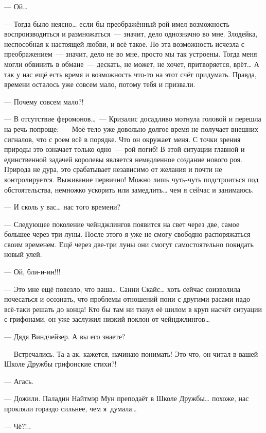 \documentclass[fontsize=11pt,a5paper,titlepage=firstcover]{scrbook}
\begin{document}
--- Ой{\ldots}

--- Тогда было неясно{\ldots} если бы преображённый рой имел возможность воспроизводиться и размножаться~--- значит, дело однозначно во мне. Злодейка, неспособная к настоящей любви, и всё такое. Но эта возможность исчезла с преображением~--- значит, дело не во мне, просто мы так устроены. Тогда меня могли обвинить в обмане~--- дескать, не может, не хочет, притворяется, врёт{\ldots} А так у нас ещё есть время и возможность что-то на этот счёт придумать. Правда, времени осталось уже совсем мало, потому тебя и призвали.

--- Почему совсем мало?!

--- В отсутствие феромонов{\ldots}~--- Кризалис досадливо мотнула головой и перешла на речь попроще:~--- Моё тело уже довольно долгое время не получает внешних сигналов, что с роем всё в порядке. Что он окружает меня. С точки зрения природы это означает только одно~--- рой погиб! В этой ситуации главной и единственной задачей королевы является немедленное создание нового роя. Природа не дура, это срабатывает независимо от желания и почти не контролируется. Выживание первично! Можно лишь чуть-чуть подстроиться под обстоятельства, немножко ускорить или замедлить{\ldots} чем я сейчас и занимаюсь.

--- И сколь у вас{\ldots} нас того времени?

--- Следующее поколение чейнджлингов появится на свет через две, самое большее через три луны. После этого я уже не смогу свободно распоряжаться своим временем. Ещё через две-три луны они смогут самостоятельно покидать новый улей.

--- Ой, бли-и-ин!!!

--- Это мне ещё повезло, что ваша{\ldots} Санни Скайс{\ldots} хоть сейчас соизволила почесаться и осознать, что проблемы отношений пони с другими расами надо всё-таки решать до конца! Кто бы там ни ткнул её шилом в круп насчёт ситуации с грифонами, он уже заслужил низкий поклон от чейнджлингов{\ldots}

--- Дядя Виндчейзер. А вы его знаете?

--- Встречались. Та-а-ак, кажется, начинаю понимать! Это что, он читал в вашей Школе Дружбы грифонские стихи?!

--- Агась.

--- Дожили. Паладин Найтмэр Мун преподаёт в Школе Дружбы{\ldots} похоже, нас прокляли гораздо сильнее, чем я~думала{\ldots}

--- Чё?!..
\end{document}
